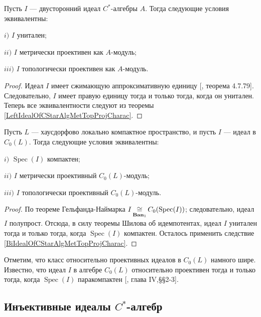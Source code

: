 \begin{corollary}\label{BiIdealOfCStarAlgMetTopProjCharac} Пусть $I$ --- двусторонний идеал $C^*$-алгебры $A$. Тогда следующие условия эквивалентны:

$i)$ $I$ унитален;

$ii)$ $I$ метрически проективен как $A$-модуль;

$iii)$ $I$ топологически проективен как $A$-модуль.
\end{corollary}
\begin{proof} Идеал $I$ имеет сжимающую аппроксимативную единицу [\cite{HelBanLocConvAlg}, теорема 4.7.79]. Следовательно, $I$ имеет правую единицу тогда и только тогда, когда он унитален. Теперь все эквивалентности следуют из теоремы \ref{LeftIdealOfCStarAlgMetTopProjCharac}. 
\end{proof}

\begin{corollary}\label{IdealofCommCStarAlgMetTopProjCharac} Пусть $L$ --- хаусдорфово локально компактное пространство, и пусть $I$ --- идеал в $C_0(L)$. Тогда следующие условия эквивалентны:

$i)$ $\operatorname{Spec}(I)$ компактен;

$ii)$ $I$ метрически проективный $C_0(L)$-модуль;

$iii)$ $I$ топологически проективный $C_0(L)$-модуль.
\end{corollary}
\begin{proof} По теореме Гельфанда-Наймарка $I\mathop{\mathbin{\cong}}\limits_{\mathbf{Ban}_1}C_0(\operatorname{Spec}(I))$; следовательно, идеал $I$ полупрост. Отсюда, в силу теоремы Шилова об идемпотентах, идеал $I$ унитален тогда и только тогда, когда $\operatorname{Spec}(I)$ компактен. Осталось применить следствие \ref{BiIdealOfCStarAlgMetTopProjCharac}. 
\end{proof}

Отметим, что класс относительно проективных идеалов в $C_0(L)$ намного шире. Известно, что идеал $I$ в алгебре $C_0(L)$ относительно проективен тогда и только тогда, когда $\operatorname{Spec}(I)$ паракомпактен [\cite{HelHomolBanTopAlg}, глава IV,\S\S 2-3].


\subsection{Инъективные идеалы \texorpdfstring{$C^*$}{C*}-алгебр}
\label{SubSectionInjectiveIdealsOfCStarAlgebras}

